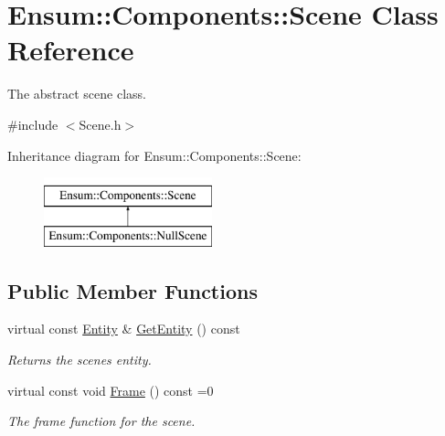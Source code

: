 \hypertarget{class_ensum_1_1_components_1_1_scene}{}\section{Ensum\+:\+:Components\+:\+:Scene Class Reference}
\label{class_ensum_1_1_components_1_1_scene}


The abstract scene class.  




{\ttfamily \#include $<$Scene.\+h$>$}

Inheritance diagram for Ensum\+:\+:Components\+:\+:Scene\+:\begin{figure}[H]
\begin{center}
\leavevmode
\includegraphics[height=2.000000cm]{class_ensum_1_1_components_1_1_scene}
\end{center}
\end{figure}
\subsection*{Public Member Functions}
\begin{DoxyCompactItemize}
\item 
virtual const \hyperlink{struct_ensum_1_1_components_1_1_entity}{Entity} \& \hyperlink{class_ensum_1_1_components_1_1_scene_ab614d491401edd9db3584d4e61ef6416}{Get\+Entity} () const \hypertarget{class_ensum_1_1_components_1_1_scene_ab614d491401edd9db3584d4e61ef6416}{}\label{class_ensum_1_1_components_1_1_scene_ab614d491401edd9db3584d4e61ef6416}

\begin{DoxyCompactList}\small\item\em Returns the scenes entity. \end{DoxyCompactList}\item 
virtual const void \hyperlink{class_ensum_1_1_components_1_1_scene_af80a7a08e14551bbd411c235cbd7ebe9}{Frame} () const  =0\hypertarget{class_ensum_1_1_components_1_1_scene_af80a7a08e14551bbd411c235cbd7ebe9}{}\label{class_ensum_1_1_components_1_1_scene_af80a7a08e14551bbd411c235cbd7ebe9}

\begin{DoxyCompactList}\small\item\em The frame function for the scene. \end{DoxyCompactList}\end{DoxyCompactItemize}
